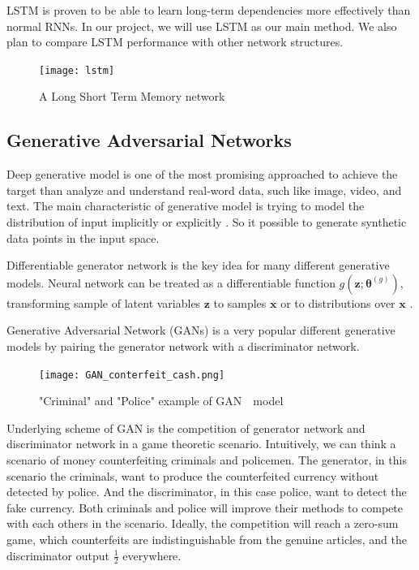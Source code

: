 LSTM is proven to be able to learn long-term dependencies more effectively than normal RNNs. In our project, we will use LSTM as our main method. We also plan to compare LSTM performance with other network structures.
\begin{figure}[htb]
	\centering
	\texttt{[image: lstm]}
	\caption{A Long Short Term Memory network}
	\label{fig:lstm}
\end{figure} 

\subsection{Generative Adversarial Networks}
Deep generative model is one of the most promising approached to achieve the target than analyze and understand real-word data, such like image, video, and text. The main characteristic of generative model is trying to model the distribution of input implicitly or explicitly \cite{christopher2006prml}. So it possible to generate synthetic data points in the input space.

Differentiable generator network is the key idea for many different generative models. Neural network can be treated as a differentiable function $ g(\bm{z};\bm{\theta}^{(g)}) $, transforming sample of latent variables $ \mathbf{z} $ to samples $ \mathbf{x} $ or to distributions over $ \mathbf{x} $ \cite{goodfellow2016deeplearning}.

Generative Adversarial Network (GANs) \cite{goodfellow2014gan} is a very popular different generative models by pairing the generator network with a discriminator network.

\begin{figure}[htbp]
	\centering
	\texttt{[image: GAN\_conterfeit\_cash.png]}
	\caption{"Criminal" and "Police" example of GAN　model}
	\label{fig:GANcash}
\end{figure}




Underlying scheme of GAN is the competition of generator network and discriminator network in a game theoretic scenario. Intuitively, we can think a scenario of money counterfeiting criminals and policemen. The generator, in this scenario the criminals, want to produce the counterfeited currency without detected by police. And the discriminator, in this case police, want to detect the fake currency. Both criminals and police will improve their methods to compete with each others in the scenario. Ideally,  the competition will reach a zero-sum game, which counterfeits are indistinguishable from the genuine articles, and the discriminator output $ \frac{1}{2} $ everywhere.
 
